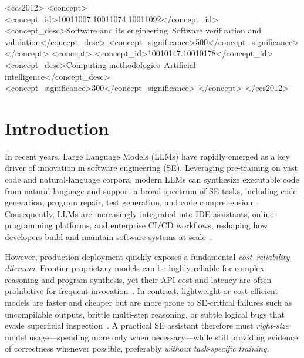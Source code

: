 \documentclass[acmsmall,screen,review,anonymous]{acmart}
\begin{document}
\begin{CCSXML}
<ccs2012>
   <concept>
       <concept_id>10011007.10011074.10011092</concept_id>
       <concept_desc>Software and its engineering~Software verification and validation</concept_desc>
       <concept_significance>500</concept_significance>
   </concept>
   <concept>
       <concept_id>10010147.10010178</concept_id>
       <concept_desc>Computing methodologies~Artificial intelligence</concept_desc>
       <concept_significance>300</concept_significance>
   </concept>
</ccs2012>
\end{CCSXML}



\maketitle



\section{Introduction}
In recent years, Large Language Models (LLMs) have rapidly emerged as a key driver of innovation in software engineering (SE).
Leveraging pre-training on vast code and natural-language corpora, modern LLMs can synthesize executable code from natural language and support a broad spectrum of SE tasks, including code generation, program repair, test generation, and code comprehension~\cite{chen2024survey,hou2024large,yu2024humaneval,zhang2024systematic}.
Consequently, LLMs are increasingly integrated into IDE assistants, online programming platforms, and enterprise CI/CD workflows, reshaping how developers build and maintain software systems at scale~\cite{hou2024large,yang2025survey,sun2025empirical}.

However, production deployment quickly exposes a fundamental \emph{cost--reliability dilemma}.
Frontier proprietary models can be highly reliable for complex reasoning and program synthesis, yet their API cost and latency are often prohibitive for frequent invocation~\cite{liu2023your,li2023acecoder}.
In contrast, lightweight or cost-efficient models are faster and cheaper but are more prone to SE-critical failures such as uncompilable outputs, brittle multi-step reasoning, or subtle logical bugs that evade superficial inspection~\cite{jin2023inferfix,jiang2024rocode}.
A practical SE assistant therefore must \emph{right-size} model usage---spending more only when necessary---while still providing evidence of correctness whenever possible, preferably \emph{without task-specific training}.
\end{document}
